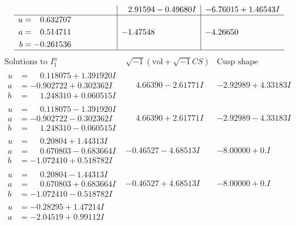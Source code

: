 \documentclass[1p]{elsarticle_modified}
\theoremstyle{definition}
\newcommand{\I}{\sqrt{-1}}
\begin{document}
$$\begin{array}{c|c|c}
 & \phantom{-}2.91594 - 0.49680 I & -6.76015 + 1.46543 I \\ \hline\begin{aligned}
u &= \phantom{-}0.632707\phantom{ +0.000000I} \\
a &= \phantom{-}0.514711\phantom{ +0.000000I} \\
b &= -0.261536\phantom{ +0.000000I}\end{aligned}
 & -1.47548\phantom{ +0.000000I} & -4.26650\phantom{ +0.000000I}\\
 \hline 
 \end{array}$$\newpage$$\begin{array}{c|c|c}  
\text{Solutions to }I^u_{1}& \I (\text{vol} + \sqrt{-1}CS) & \text{Cusp shape}\\
 \hline 
\begin{aligned}
u &= \phantom{-}0.118075 + 1.391920 I \\
a &= -0.902722 + 0.302362 I \\
b &= \phantom{-}1.248310 + 0.060515 I\end{aligned}
 & \phantom{-}4.66390 - 2.61771 I & -2.92989 + 4.33183 I \\ \hline\begin{aligned}
u &= \phantom{-}0.118075 - 1.391920 I \\
a &= -0.902722 - 0.302362 I \\
b &= \phantom{-}1.248310 - 0.060515 I\end{aligned}
 & \phantom{-}4.66390 + 2.61771 I & -2.92989 - 4.33183 I \\ \hline\begin{aligned}
u &= \phantom{-}0.20804 + 1.44313 I \\
a &= \phantom{-}0.670803 - 0.683664 I \\
b &= -1.072410 + 0.518782 I\end{aligned}
 & -0.46527 - 4.68513 I & -8.00000 + 0. I\phantom{ +0.000000I} \\ \hline\begin{aligned}
u &= \phantom{-}0.20804 - 1.44313 I \\
a &= \phantom{-}0.670803 + 0.683664 I \\
b &= -1.072410 - 0.518782 I\end{aligned}
 & -0.46527 + 4.68513 I & -8.00000 + 0. I\phantom{ +0.000000I} \\ \hline\begin{aligned}
u &= -0.28295 + 1.47214 I \\
a &= -2.04519 + 0.99112 I \\

\end{aligned}
\end{array}$$
\end{document}
